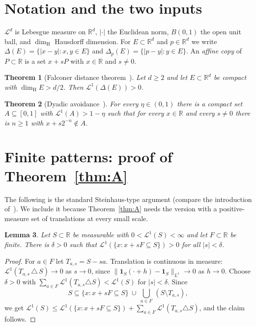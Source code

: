 \documentclass[11pt]{amsart}
\newtheorem{theorem}{Theorem}[section]
\newtheorem{lemma}[theorem]{Lemma}
\theoremstyle{definition}
\theoremstyle{remark}
\newcommand{\R}{\mathbb{R}}
\newcommand{\dimH}{\dim_{\mathrm H}}
\newcommand{\Lm}{\mathcal{L}}
\begin{document}
\section{Notation and the two inputs}\label{sec:inputs}
$\Lm^d$ is Lebesgue measure on $\R^d$, $|\cdot|$ the Euclidean norm, $B(0,1)$ the open unit
ball, and $\dimH$ Hausdorff dimension. For $E\subset\R^d$ and $p\in\R^d$ we write
$\Delta(E)=\{|x-y|:x,y\in E\}$ and $\Delta_p(E)=\{|p-y|:y\in E\}$. An \emph{affine copy} of
$P\subset\R$ is a set $x+sP$ with $x\in\R$ and $s\ne0$.

\begin{theorem}[Falconer distance theorem~{\cite{OAIFalconer}}]\label{thm:inputFalconer}
Let $d\ge2$ and let $E\subset\R^d$ be compact with $\dimH E>d/2$. Then $\Lm^1(\Delta(E))>0$.
\end{theorem}

\begin{theorem}[Dyadic avoidance~{\cite{OAIDyadic}}]\label{thm:inputDyadic}
For every $\eta\in(0,1)$ there is a compact set $A\subseteq[0,1]$ with $\Lm^1(A)>1-\eta$ such that
for every $x\in\R$ and every $s\neq0$ there is $n\ge1$ with $x+s2^{-n}\notin A$.
\end{theorem}

\section{Finite patterns: proof of Theorem~\ref{thm:A}}

The following is the standard Steinhaus-type argument (compare the introduction
of~\cite{OAIDyadic}). We include it because Theorem~\ref{thm:A} needs the version with a
positive-measure set of translations at every small scale.

\begin{lemma}\label{lem:steinhaus}
Let $S\subset\R$ be measurable with $0<\Lm^1(S)<\infty$ and let $F\subset\R$ be finite. There is
$\delta>0$ such that $\Lm^1(\{x:x+sF\subseteq S\})>0$ for all $|s|<\delta$.
\end{lemma}

\begin{proof}
For $a\in F$ let $T_{a,s}=S-sa$. Translation is continuous in measure:
$\Lm^1(T_{a,s}\,\triangle\,S)\to0$ as $s\to0$, since $\|\mathbf 1_S(\cdot+h)-\mathbf 1_S\|_{L^1}\to0$
as $h\to0$. Choose $\delta>0$ with $\sum_{a\in F}\Lm^1(T_{a,s}\triangle S)<\Lm^1(S)$ for $|s|<\delta$.
Since
\[
  S\subseteq\{x: x+sF\subseteq S\}\ \cup\ \bigcup_{a\in F}\,(S\setminus T_{a,s}),
\]
we get $\Lm^1(S)\le\Lm^1(\{x:x+sF\subseteq S\})+\sum_{a\in F}\Lm^1(T_{a,s}\triangle S)$, and the
claim follows.
\end{proof}
\end{document}
